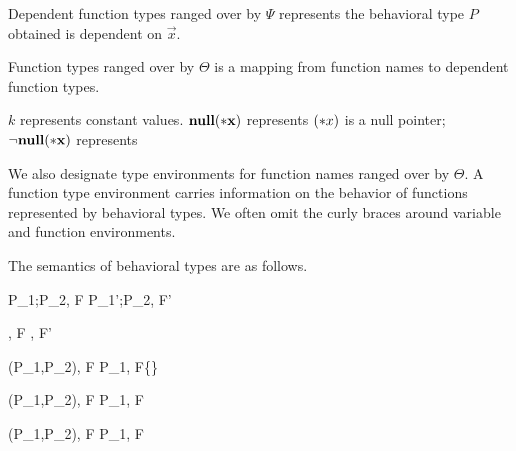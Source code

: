 Dependent function types ranged over by \(\Psi\) represents the behavioral type
\(P\) obtained is dependent on \(\vec{x}\).

Function types ranged over by \(\Theta\) is a mapping from function names to dependent function types.

\(k\) represents constant values. \(\bf{null}(*x)\) represents \((*x)\) is a null pointer; \(\neg\bf{null}(*x)\) represents 

We also designate type
environments for function names ranged over by \(\Theta\).  A function
type environment carries information on the behavior of functions
represented by behavioral types.  We often omit the curly braces
around variable and function environments.


The semantics of behavioral types are as follows.







{ \langle P_1;P_2, F \rangle \xlongrightarrow{\rho} \langle P_1';P_2, F' \rangle }


{ \langle \Endconst, F \rangle \rightarrow {}, F' \rangle }

{ \langle \Sirx (P_1,P_2), F \rangle \rightarrow \langle P_1, F\cup\{\snull\} \rangle }

{ \langle \Sirx (P_1,P_2), F \rangle \rightarrow \langle P_1, F \rangle }

{ \langle \Sirx (P_1,P_2), F \rangle \rightarrow \langle P_1, F \rangle }

